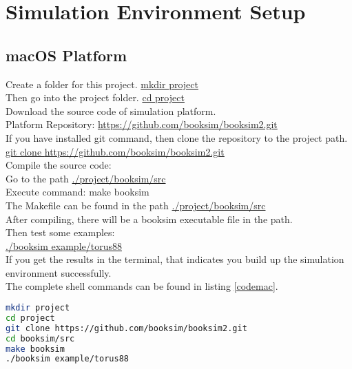 \chapter{Simulation Environment Setup} \label{ch-0}



\section{macOS Platform}
Create a folder for this project.
\underline{mkdir project}\\
Then go into the project folder. 
\underline{cd project}\\
Download the source code of simulation platform.\\
Platform Repository: \url{https://github.com/booksim/booksim2.git} \\
If you have installed git command, then clone the repository to the project path.
\underline{git clone \url{https://github.com/booksim/booksim2.git}}\\
Compile the source code:\\
Go to the path \underline{./project/booksim/src}\\
Execute command: make booksim\\
The Makefile can be found in the path \underline{./project/booksim/src}\\
After compiling, there will be a booksim executable file in the path.\\
Then test some examples:\\
\underline{./booksim example/torus88}\\
If you get the results in the terminal, that indicates you build up the simulation environment successfully.\\
The complete shell commands can be found in listing \ref{codemac}.


\begin{lstlisting}[language=sh, caption= Shell Code, label = codemac]
mkdir project
cd project
git clone https://github.com/booksim/booksim2.git
cd booksim/src
make booksim
./booksim example/torus88

\end{lstlisting}

